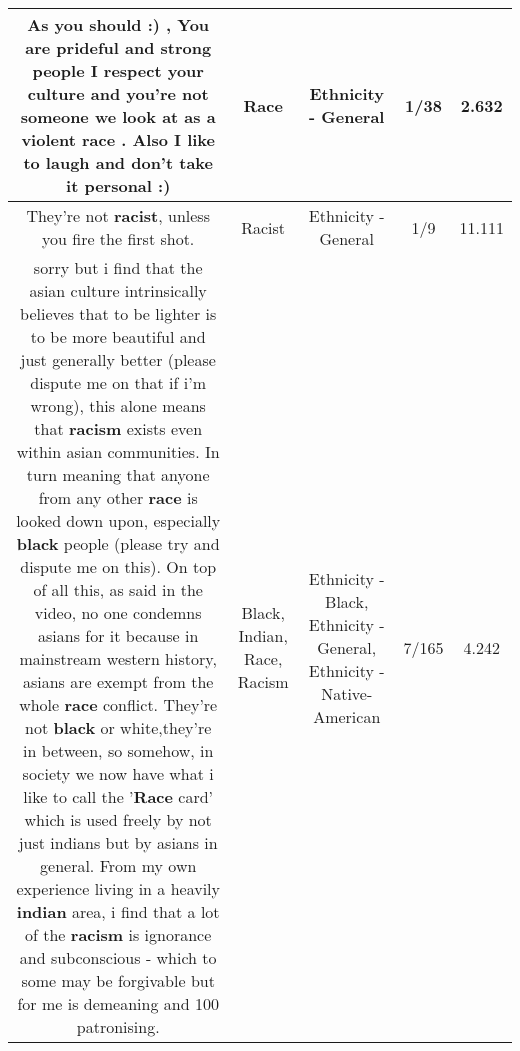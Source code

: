 \documentclass[11pt]{article}
\newlength\mylength
\begin{document}
\begin{center}
\begin{longtable}{|C{.65\mylength}|C{.30\mylength}|C{.12\mylength}|C{.12\mylength}|C{.12\mylength}|}
  \small As you should :) , You are prideful and strong people I respect your culture and you're not someone we look at as a violent \textbf{race} . Also I like to laugh and don't take it personal :)\normalsize   & Race & Ethnicity - General & 1/38 & 2.632 \\  \hline
  \small They're not \textbf{racist}, unless you fire the first shot.\normalsize   & Racist & Ethnicity - General & 1/9 & 11.111 \\  \hline
  \small sorry but i find that the asian culture intrinsically believes that to be lighter is to be more beautiful and just generally better (please dispute me on that if i'm wrong), this alone means that \textbf{racism} exists even within asian communities. In turn meaning that anyone from any other \textbf{race} is looked down upon, especially \textbf{black} people (please try and dispute me on this). On top of all this, as said in the video, no one condemns asians for it because in mainstream western history, asians are exempt from the whole \textbf{race} conflict. They're not \textbf{black} or white,they're in between, so somehow, in society we now have what i like to call the '\textbf{Race} card' which is used freely by not just indians but by asians in general. From my own experience living in a heavily \textbf{indian} area, i find that a lot of the \textbf{racism} is ignorance and subconscious - which to some may be forgivable but for me is demeaning and 100 patronising.\normalsize   & Black, Indian, Race, Racism & Ethnicity - Black, Ethnicity - General, Ethnicity - Native-American & 7/165 & 4.242 \\  \hline

\end{longtable}
\end{center}
\end{document}
